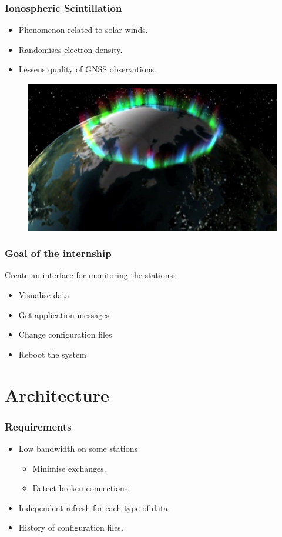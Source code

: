 \documentclass{beamer}
\begin{document}

\begin{frame}
\frametitle{Ionospheric Scintillation}
\begin{itemize}
	\item[] Phenomenon related to solar winds.
	\item[] Randomises electron density.
	\item[] Lessens quality of GNSS observations.
\end{itemize}

\begin{figure}
	\includegraphics[width=0.7\linewidth]{images/auroral_oval}
\end{figure}

\end{frame}



\begin{frame}
\frametitle{Goal of the internship}

Create an interface for monitoring the stations:
\begin{itemize}
	\item Visualise data
	\item Get application messages %
	\item Change configuration files
	\item Reboot the system
\end{itemize}

\end{frame}


\section{Architecture}
\frame{\sectionpage}

\begin{frame}
\frametitle{Requirements}
\begin{itemize}
	\item Low bandwidth on some stations
	\begin{itemize}[label=$\Rightarrow$]
		\item Minimise exchanges.
		\item Detect broken connections.
	\end{itemize}
	\item Independent refresh for each type of data.
	\item History of configuration files.
\end{itemize}
\end{frame}
\end{document}
